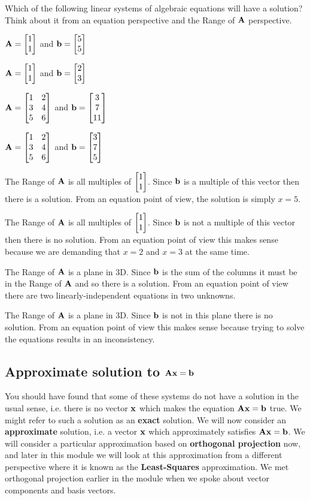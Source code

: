 \begin{prob}
Which of the following linear systems of algebraic equations will have a solution? Think about it from an equation perspective and the Range of $\mathbf{A}$ perspective.
\be
\item $\mathbf{A} = \begin{bmatrix} 1 \\ 1 \end{bmatrix}$ and $\mathbf{b} = \begin{bmatrix} 5 \\ 5 \end{bmatrix}$ 
\item $\mathbf{A} = \begin{bmatrix} 1 \\ 1 \end{bmatrix}$ and $\mathbf{b} = \begin{bmatrix} 2 \\ 3 \end{bmatrix}$
\item $\mathbf{A} = \begin{bmatrix} 1 & 2 \\ 3 & 4 \\ 5 & 6 \end{bmatrix}$ and $\mathbf{b} = \begin{bmatrix} 3 \\ 7 \\ 11 \end{bmatrix}$
\item $\mathbf{A} = \begin{bmatrix} 1 & 2 \\ 3 & 4 \\ 5 & 6 \end{bmatrix}$ and $\mathbf{b} = \begin{bmatrix} 3 \\ 7 \\ 5 \end{bmatrix}$
\ee
\end{prob}
\begin{sol}
\be
\item The Range of $\mathbf{A}$ is all multiples of $\begin{bmatrix} 1 \\ 1 \end{bmatrix}$. Since $\mathbf{b}$ is a multiple of this vector then there is a solution. From an equation point of view, the solution is simply $x=5$.
\item The Range of $\mathbf{A}$ is all multiples of $\begin{bmatrix} 1 \\ 1 \end{bmatrix}$. Since $\mathbf{b}$ is not a multiple of this vector then there is no solution. From an equation point of view this makes sense because we are demanding that $x=2$ and $x=3$ at the same time.
\item The Range of $\mathbf{A}$ is a plane in 3D. Since $\mathbf{b}$ is the sum of the columns it must be in the Range of $\mathbf{A}$ and so there is a solution. From an equation point of view there are two linearly-independent equations in two unknowns.
\item The Range of $\mathbf{A}$ is a plane in 3D. Since $\mathbf{b}$ is not in this plane there is no solution. From an equation point of view this makes sense because trying to solve the equations results in an inconsistency.
\ee
\end{sol}

\subsection{Approximate solution to $\mathbf{A} \mathbf{x} = \mathbf{b}$}
You should have found that some of these systems do not have a solution in the usual sense, i.e. there is no vector $\mathbf{x}$ which makes the equation $\mathbf{A} \mathbf{x} = \mathbf{b}$ true. We might refer to such a solution as an \textbf{exact} solution. We will now consider an \textbf{approximate} solution, i.e. a vector $\mathbf{x}$ which approximately satisfies $\mathbf{A} \mathbf{x} = \mathbf{b}$. We will consider a particular approximation based on \textbf{orthogonal projection} now, and later in this module we will look at this approximation from a different perspective where it is known as the \textbf{Least-Squares} approximation. We met orthogonal projection earlier in the module when we spoke about vector components and basis vectors.

